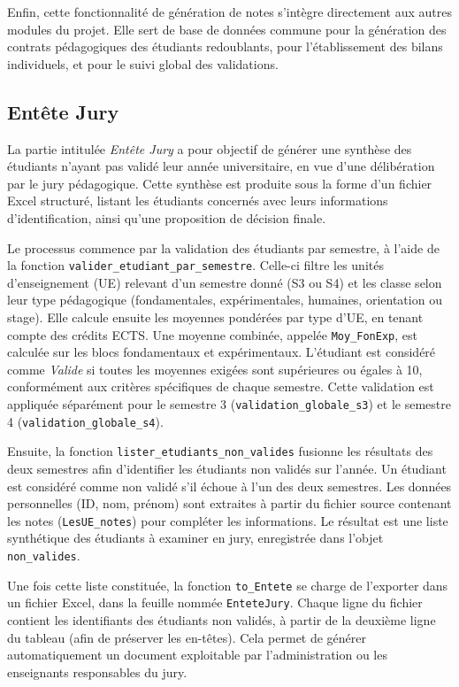 Enfin, cette fonctionnalité de génération de notes s’intègre directement aux autres modules du projet. Elle sert de base de données commune pour la génération des contrats pédagogiques des étudiants redoublants, pour l’établissement des bilans individuels, et pour le suivi global des validations.

\subsection{Entête Jury}

La partie intitulée \textit{Entête Jury} a pour objectif de générer une synthèse des étudiants n’ayant pas validé leur année universitaire, en vue d’une délibération par le jury pédagogique. Cette synthèse est produite sous la forme d’un fichier Excel structuré, listant les étudiants concernés avec leurs informations d’identification, ainsi qu’une proposition de décision finale.

Le processus commence par la validation des étudiants par semestre, à l’aide de la fonction \texttt{valider\_etudiant\_par\_semestre}. Celle-ci filtre les unités d’enseignement (UE) relevant d’un semestre donné (S3 ou S4) et les classe selon leur type pédagogique (fondamentales, expérimentales, humaines, orientation ou stage). Elle calcule ensuite les moyennes pondérées par type d’UE, en tenant compte des crédits ECTS. Une moyenne combinée, appelée \texttt{Moy\_FonExp}, est calculée sur les blocs fondamentaux et expérimentaux. L'étudiant est considéré comme \textit{Valide} si toutes les moyennes exigées sont supérieures ou égales à 10, conformément aux critères spécifiques de chaque semestre. Cette validation est appliquée séparément pour le semestre 3 (\texttt{validation\_globale\_s3}) et le semestre 4 (\texttt{validation\_globale\_s4}).

Ensuite, la fonction \texttt{lister\_etudiants\_non\_valides} fusionne les résultats des deux semestres afin d’identifier les étudiants non validés sur l’année. Un étudiant est considéré comme non validé s’il échoue à l’un des deux semestres. Les données personnelles (ID, nom, prénom) sont extraites à partir du fichier source contenant les notes (\texttt{LesUE\_notes}) pour compléter les informations. Le résultat est une liste synthétique des étudiants à examiner en jury, enregistrée dans l’objet \texttt{non\_valides}.

Une fois cette liste constituée, la fonction \texttt{to\_Entete} se charge de l’exporter dans un fichier Excel, dans la feuille nommée \texttt{EnteteJury}. Chaque ligne du fichier contient les identifiants des étudiants non validés, à partir de la deuxième ligne du tableau (afin de préserver les en-têtes). Cela permet de générer automatiquement un document exploitable par l’administration ou les enseignants responsables du jury.

